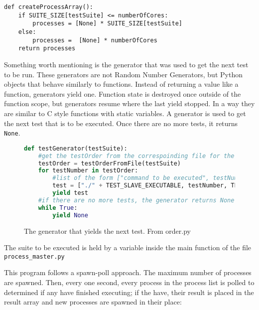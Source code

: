 \begin{verbatim}
def createProcessArray():
    if SUITE_SIZE[testSuite] <= numberOfCores:
        processes = [None] * SUITE_SIZE[testSuite]
    else:
        processes =  [None] * numberOfCores
    return processes
\end{verbatim}

Something worth mentioning is the generator that was used to get the next test to be run. These generators are not Random Number Generators, but Python objects that behave similarly to functions. Instead of returning a value like a function, generators yield one. Function state is destroyed once outside of the function scope, but generators resume where the last yield stopped. In a way they are similar to C style functions with static variables. A generator is used to get the next test that is to be executed. Once there are no more tests, it returns \texttt{None}.

\begin{figure}[h]
\begin{lstlisting}[language=Python]
def testGenerator(testSuite):
    #get the testOrder from the correspoinding file for the suite
    testOrder = testOrderFromFile(testSuite)
    for testNumber in testOrder:
        #list of the form ["command to be executed", testNumber, testSuiteNameString]
        test = ["./" + TEST_SLAVE_EXECUTABLE, testNumber, TEST_SUITES[testSuite]]
        yield test
    #if there are no more tests, the generator returns None
    while True:
        yield None
\end{lstlisting}
        \caption{The generator that yields the next test. From order.py}
        \label{fig:testOrderGenerator}
\end{figure}

The suite to be executed is held by a variable inside the main function of the file \texttt{process\_master.py}

This program follows a spawn-poll approach. The maximum number of processes are spawned. Then, every one second, every process in the process list is polled to determined if any have finished executing; if the have, their result is placed in the result array and new processes are spawned in their place:

